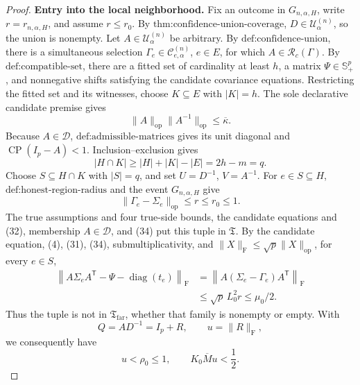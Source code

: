\documentclass{article}
\begin{document}
\begin{proof}
\textbf{Entry into the local neighborhood.}
Fix an outcome in \(G_{n,\alpha,H}\), write \(r=r_{n,\alpha,H}\), and assume \(r\leq r_0\). By \(\text{thm:confidence-union-coverage}\), \(D\in\mathcal U^{(n)}_\alpha\), so the union is nonempty. Let \(A\in\mathcal U^{(n)}_\alpha\) be arbitrary. By \(\text{def:confidence-union}\), there is a simultaneous selection \(\Gamma_e\in\mathcal C^{(n)}_{e,\alpha}\), \(e\in E\), for which \(A\in\mathcal R_c(\Gamma)\). By \(\text{def:compatible-set}\), there are a fitted set of cardinality at least \(h\), a matrix \(\Psi\in\mathbb S_+^p\), and nonnegative shifts satisfying the candidate covariance equations. Restricting the fitted set and its witnesses, choose \(K\subseteq E\) with \(|K|=h\). The sole declarative candidate premise gives
\[
\|A\|_{\mathrm{op}}\|A^{-1}\|_{\mathrm{op}}
\leq\overline\kappa.
\tag{32}
\]
Because \(A\in\mathcal D\), \(\text{def:admissible-matrices}\) gives its unit diagonal and \(\operatorname{CP}(I_p-A)<1\). Inclusion--exclusion gives
\[
|H\cap K|
\geq|H|+|K|-|E|
=2h-m=q.
\tag{33}
\]
Choose \(S\subseteq H\cap K\) with \(|S|=q\), and set \(U=D^{-1}\), \(V=A^{-1}\). For \(e\in S\subseteq H\), \(\text{def:honest-region-radius}\) and the event \(G_{n,\alpha,H}\) give
\[
\|\Gamma_e-\Sigma_e\|_{\mathrm{op}}
\leq r\leq r_0\leq1.
\tag{34}
\]
The true assumptions and four true-side bounds, the candidate equations and (32), membership \(A\in\mathcal D\), and (34) put this tuple in \(\mathfrak T\). By the candidate equation, (4), (31), (34), submultiplicativity, and \(\|X\|_{\mathrm F}\leq\sqrt p\|X\|_{\mathrm{op}}\), for every \(e\in S\),
\[
\begin{aligned}
\left\|A\Sigma_eA^{\mathsf T}
-\Psi-\operatorname{diag}(t_e)\right\|_{\mathrm F}
&=\left\|A(\Sigma_e-\Gamma_e)A^{\mathsf T}\right\|_{\mathrm F}\\
&\leq\sqrt p\,L_0^2r
\leq\mu_0/2.
\end{aligned}
\tag{35}
\]
Thus the tuple is not in \(\mathfrak T_{\mathrm{far}}\), whether that family is nonempty or empty. With
\[
Q=AD^{-1}=I_p+R,
\qquad
u=\|R\|_{\mathrm F},
\]
we consequently have
\[
u<\rho_0\leq1,
\qquad
K_0\overline M u<\frac12.
\tag{36}
\]


\end{proof}
\end{document}
